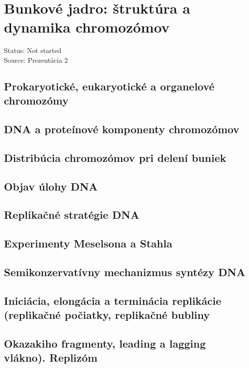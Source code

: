 \section{Bunkové jadro: štruktúra a dynamika chromozómov}
Status: Not started\\
Source: Prezentácia 2\\

\subsection*{Prokaryotické, eukaryotické a organelové chromozómy}

\subsection*{DNA a proteínové komponenty chromozómov}

\subsection*{Distribúcia chromozómov pri delení buniek}

\subsection*{Objav úlohy DNA}

\subsection*{Replikačné stratégie DNA}

\subsection*{Experimenty Meselsona a Stahla}

\subsection*{Semikonzervatívny mechanizmus syntézy DNA}

\subsection*{Iniciácia, elongácia a terminácia replikácie (replikačné počiatky, replikačné bubliny}

\subsection*{Okazakiho fragmenty, leading a lagging vlákno). Replizóm}

